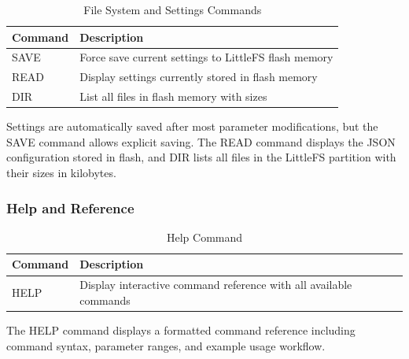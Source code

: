 \begin{table}[H]
\centering
\begin{tabular}{@{}ll@{}}
\toprule
\textbf{Command} & \textbf{Description} \\
\midrule
SAVE & Force save current settings to LittleFS flash memory \\
READ & Display settings currently stored in flash memory \\
DIR & List all files in flash memory with sizes \\
\bottomrule
\end{tabular}
\caption{File System and Settings Commands}
\end{table}

Settings are automatically saved after most parameter modifications, but the SAVE command allows explicit saving. The READ command displays the JSON configuration stored in flash, and DIR lists all files in the LittleFS partition with their sizes in kilobytes.

\subsubsection{Help and Reference}
\begin{table}[H]
\centering
\begin{tabular}{@{}ll@{}}
\toprule
\textbf{Command} & \textbf{Description} \\
\midrule
HELP & Display interactive command reference with all available commands \\
\bottomrule
\end{tabular}
\caption{Help Command}
\end{table}

The HELP command displays a formatted command reference including command syntax, parameter ranges, and example usage workflow.
